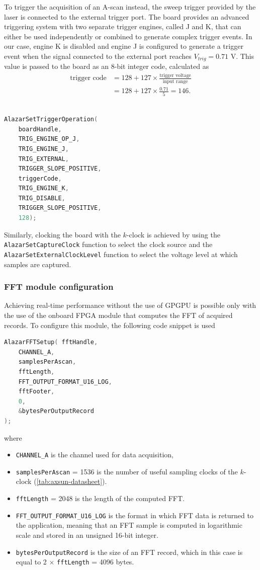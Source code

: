 To trigger the acquisition of an A-scan instead, the sweep trigger provided by the laser is connected to the external trigger port. The board provides an advanced triggering system with two separate trigger engines, called J and K, that can either be used independently or combined to generate complex trigger events. In our case, engine K is disabled and engine J is configured to generate a trigger event when the signal connected to the external port reaches $V_{trig} = 0.71$ V. This value is passed to the board as an 8-bit integer code, calculated as 
\begin{align}
	\text{trigger code} &= 128 + 127 \times \frac{\text{trigger voltage}}{\text{input range}}\\
					&= 128 + 127 \times \frac{0.71}{5} = 146.
\end{align}

\begin{lstlisting}[language=C,frame=tb]

AlazarSetTriggerOperation(
	boardHandle,
	TRIG_ENGINE_OP_J,
	TRIG_ENGINE_J,
	TRIG_EXTERNAL,
	TRIGGER_SLOPE_POSITIVE,
	triggerCode, 
	TRIG_ENGINE_K, 
	TRIG_DISABLE, 
	TRIGGER_SLOPE_POSITIVE,
	128);

\end{lstlisting}

Similarly, clocking the board with the $k$-clock is achieved by using the \texttt{AlazarSetCaptureClock} function to select the clock source and the \texttt{AlazarSetExternalClockLevel} function to select the voltage level at which samples are captured.


\subsubsection{FFT module configuration}
Achieving real-time performance without the use of \ac{GPGPU} is possible only with the use of the onboard FPGA module that computes the FFT of acquired records. To configure this module, the following code snippet is used
\begin{lstlisting}[language=C,frame=tb]
AlazarFFTSetup(	fftHandle,
	CHANNEL_A,
	samplesPerAscan,
	fftLength,
	FFT_OUTPUT_FORMAT_U16_LOG,
	fftFooter,
	0,
	&bytesPerOutputRecord
);
\end{lstlisting}
where 

\begin{itemize}
	\item \texttt{CHANNEL\_A} is the channel used for data acquisition,
	\item  \texttt{samplesPerAscan} = 1536 is the number of useful sampling clocks of the $k$-clock (\autoref{tab:axsun-datasheet}).
	\item \texttt{fftLength} = 2048 is the length of the computed FFT.
	\item \texttt{FFT\_OUTPUT\_FORMAT\_U16\_LOG} is the format in which FFT data is returned to the application, meaning that an FFT sample is computed in logarithmic scale and stored in an unsigned 16-bit integer.
	\item \texttt{bytesPerOutputRecord} is the size of an FFT record, which in this case is equal to 2 $\times$ \texttt{fftLength} = 4096 bytes.
\end{itemize}

